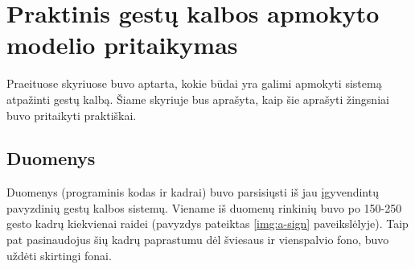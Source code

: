 \documentclass{VUMIFInfKursinis}
\begin{document}
\section{Praktinis gestų kalbos apmokyto modelio pritaikymas}

Praeituose skyriuose buvo aptarta, kokie būdai yra galimi apmokyti sistemą atpažinti gestų kalbą. Šiame skyriuje bus aprašyta, kaip šie aprašyti žingsniai buvo pritaikyti praktiškai.


\subsection{Duomenys}
Duomenys (programinis kodas ir kadrai) buvo parsisiųsti iš jau įgyvendintų pavyzdinių gestų kalbos sistemų. Viename iš duomenų rinkinių buvo po 150-250 gesto kadrų kiekvienai raidei (pavyzdys pateiktas \ref{img:a-sign} paveikslėlyje). Taip pat pasinaudojus šių kadrų paprastumu dėl šviesaus ir vienspalvio fono, buvo uždėti skirtingi fonai. 
\end{document}

